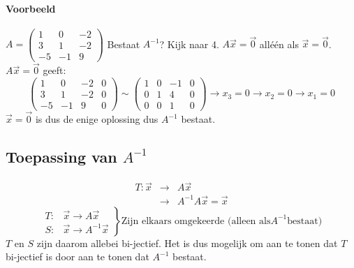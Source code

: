 \paragraph{Voorbeeld}
$A = \begin{pmatrix*} 1 & 0 & -2 \\
3 & 1 & -2 \\
-5 & -1 & 9 \end{pmatrix*}$ Bestaat $A^{-1}$?
Kijk naar 4. $A \vec{x} = \vec{0}$ all\'e\'en als $\vec{x} = \vec{0}$. $A \vec{x} = \vec{0}$ geeft:
\[ \left(\!\begin{array}{rrr|r} 1 & 0 & -2 & 0 \\
3 & 1 & -2 & 0 \\
-5 & -1 & 9 & 0 \end{array}\!\right) \sim \left(\!\begin{array}{rrr|r} 1 & 0 & -1 & 0 \\
0 & 1 & 4 & 0 \\
0 & 0 & 1 & 0 \end{array}\!\right) \to x_3 = 0 \to x_2 = 0 \to x_1 = 0\]
$\vec{x} = \vec{0}$ is dus de enige oplossing dus $A^{-1}$ bestaat.

\subsection{Toepassing van $A^{-1}$}
\begin{eqnarray*}
	T: \vec{x} &\to& A \vec{x} \\
	&\to& A^{-1}A \vec{x} = \vec{x}
\end{eqnarray*}
\[ \left. \begin{array}{ll} T: & \vec{x} \to A \vec{x} \\
S: & \vec{x} \to A^{-1} \vec{x} \end{array}\right\} \mbox{Zijn elkaars omgekeerde (alleen als} A^{-1} \mbox{bestaat}) \]
$T$ en $S$ zijn daarom allebei bi-jectief. Het is dus mogelijk om aan te tonen dat $T$ bi-jectief is door aan te tonen dat $A^{-1}$ bestaat.